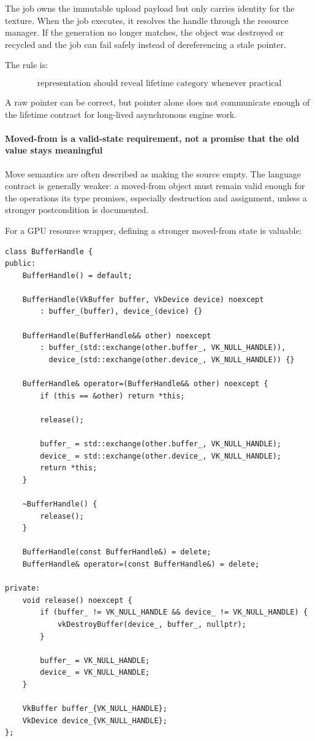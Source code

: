 The job owns the immutable upload payload but only carries identity for the texture. When the job executes, it resolves the handle through the resource manager. If the generation no longer matches, the object was destroyed or recycled and the job can fail safely instead of dereferencing a stale pointer.

The rule is:

\[
\boxed{
\text{representation should reveal lifetime category whenever practical}
}
\]

A raw pointer can be correct, but pointer alone does not communicate enough of the lifetime contract for long-lived asynchronous engine work.

\paragraph{Moved-from is a valid-state requirement, not a promise that the old value stays meaningful}\label{moved-from-is-a-valid-state-requirement-not-a-promise-that-the-old-value-stays-meaningful}

Move semantics are often described as making the source empty. The language contract is generally weaker: a moved-from object must remain valid enough for the operations its type promises, especially destruction and assignment, unless a stronger postcondition is documented.

For a GPU resource wrapper, defining a stronger moved-from state is valuable:

\begin{verbatim}
class BufferHandle {
public:
    BufferHandle() = default;

    BufferHandle(VkBuffer buffer, VkDevice device) noexcept
        : buffer_(buffer), device_(device) {}

    BufferHandle(BufferHandle&& other) noexcept
        : buffer_(std::exchange(other.buffer_, VK_NULL_HANDLE)),
          device_(std::exchange(other.device_, VK_NULL_HANDLE)) {}

    BufferHandle& operator=(BufferHandle&& other) noexcept {
        if (this == &other) return *this;

        release();

        buffer_ = std::exchange(other.buffer_, VK_NULL_HANDLE);
        device_ = std::exchange(other.device_, VK_NULL_HANDLE);
        return *this;
    }

    ~BufferHandle() {
        release();
    }

    BufferHandle(const BufferHandle&) = delete;
    BufferHandle& operator=(const BufferHandle&) = delete;

private:
    void release() noexcept {
        if (buffer_ != VK_NULL_HANDLE && device_ != VK_NULL_HANDLE) {
            vkDestroyBuffer(device_, buffer_, nullptr);
        }

        buffer_ = VK_NULL_HANDLE;
        device_ = VK_NULL_HANDLE;
    }

    VkBuffer buffer_{VK_NULL_HANDLE};
    VkDevice device_{VK_NULL_HANDLE};
};
\end{verbatim}

